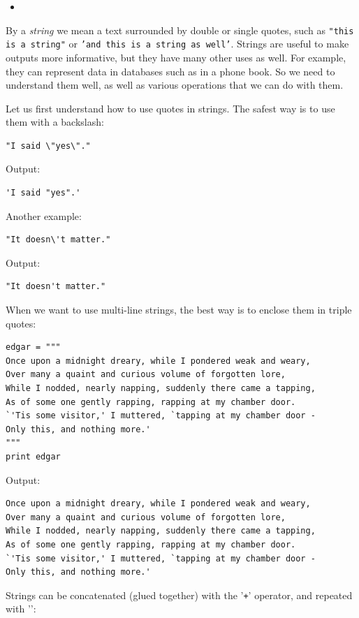 \documentclass[article,A4,12pt]{llncs}
\begin{document}
\begin{itemize}
\item
\end{itemize}

By a {\em string} we mean a text surrounded by double or single quotes, such as 
{\tt "this is a string"} or {\tt 'and this is a string as well'}.
Strings are useful to make outputs more informative, but 
they have many other uses as well. For example, they can represent data 
in databases such as in a phone book. So we need to understand them well,
as well as various operations that we can do with them.

Let us first understand how to use quotes in strings. The safest way is to use 
them with a backslash:

\begin{verbatim}
"I said \"yes\"."
\end{verbatim}
Output:

\begin{verbatim}
'I said "yes".'
\end{verbatim}
Another example:

\begin{verbatim}
"It doesn\'t matter."
\end{verbatim}
Output:

\begin{verbatim}
"It doesn't matter."
\end{verbatim}
When we want to use multi-line strings, the best way is to enclose them 
in triple quotes:

\begin{verbatim}
edgar = """
Once upon a midnight dreary, while I pondered weak and weary,
Over many a quaint and curious volume of forgotten lore,
While I nodded, nearly napping, suddenly there came a tapping,
As of some one gently rapping, rapping at my chamber door.
`'Tis some visitor,' I muttered, `tapping at my chamber door -
Only this, and nothing more.'
"""
print edgar
\end{verbatim}
Output:

\begin{verbatim}
Once upon a midnight dreary, while I pondered weak and weary,
Over many a quaint and curious volume of forgotten lore,
While I nodded, nearly napping, suddenly there came a tapping,
As of some one gently rapping, rapping at my chamber door.
`'Tis some visitor,' I muttered, `tapping at my chamber door -
Only this, and nothing more.'
\end{verbatim}
Strings can be concatenated (glued together) with the '{\tt +}' operator, and repeated with '{\tt *}':
\end{document}
